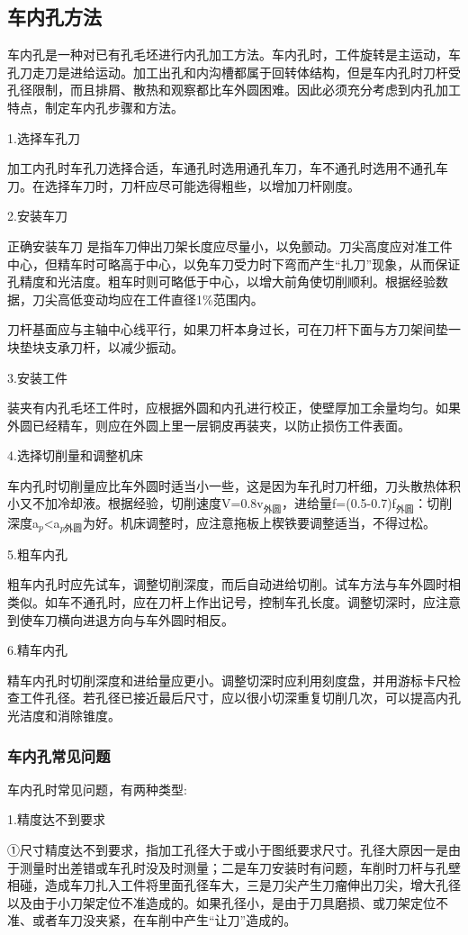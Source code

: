 \documentclass{ctexbook}
\begin{document}
\subsection{车内孔方法}
车内孔是一种对已有孔毛坯进行内孔加工方法。车内孔时，工件旋转是主运动，车孔刀走刀是进给运动。加工出孔和内沟槽都属于回转体结构，但是车内孔时刀杆受孔径限制，而且排屑、散热和观察都比车外圆困难。因此必须充分考虑到内孔加工特点，制定车内孔步骤和方法。

1.选择车孔刀

加工内孔时车孔刀选择合适，车通孔时选用通孔车刀，车不通孔时选用不通孔车刀。在选择车刀时，刀杆应尽可能选得粗些，以增加刀杆刚度。

2.安装车刀

正确安装车刀 是指车刀伸出刀架长度应尽量小，以免颤动。刀尖高度应对准工件中心，但精车时可略高于中心，以免车刀受力时下弯而产生“扎刀”现象，从而保证孔精度和光洁度。粗车时则可略低于中心，以增大前角使切削顺利。根据经验数据，刀尖高低变动均应在工件直径1\%范围内。

刀杆基面应与主轴中心线平行，如果刀杆本身过长，可在刀杆下面与方刀架间垫一块垫块支承刀杆，以减少振动。

3.安装工件

装夹有内孔毛坯工件时，应根据外圆和内孔进行校正，使壁厚加工余量均匀。如果外圆已经精车，则应在外圆上里一层铜皮再装夹，以防止损伤工件表面。

4.选择切削量和调整机床

车内孔时切削量应比车外圆时适当小一些，这是因为车孔时刀杆细，刀头散热体积小又不加冷却液。根据经验，切削速度V=0.8v$_{\text{外圆}}$，进给量f=(0.5-0.7)f$_{\text{外圆}}$：切削深度a$_{p}$<a$_{p外圆}$为好。机床调整时，应注意拖板上楔铁要调整适当，不得过松。

5.粗车内孔

粗车内孔时应先试车，调整切削深度，而后自动进给切削。试车方法与车外圆时相类似。如车不通孔时，应在刀杆上作出记号，控制车孔长度。调整切深时，应注意到使车刀横向进退方向与车外圆时相反。

6.精车内孔

精车内孔时切削深度和进给量应更小。调整切深时应利用刻度盘，并用游标卡尺检查工件孔径。若孔径已接近最后尺寸，应以很小切深重复切削几次，可以提高内孔光洁度和消除锥度。
\subsubsection{车内孔常见问题}
车内孔时常见问题，有两种类型:

1.精度达不到要求

①尺寸精度达不到要求，指加工孔径大于或小于图纸要求尺寸。孔径大原因一是由于测量时出差错或车孔时没及时测量；二是车刀安装时有问题，车削时刀杆与孔壁相碰，造成车刀扎入工件将里面孔径车大，三是刀尖产生刀瘤伸出刀尖，增大孔径以及由于小刀架定位不准造成的。如果孔径小，是由于刀具磨损、或刀架定位不准、或者车刀没夹紧，在车削中产生“让刀”造成的。
\end{document}
